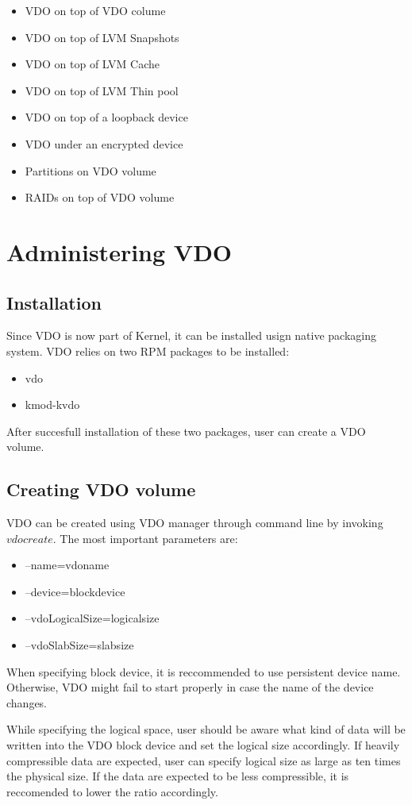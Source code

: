\documentclass[
  color, %
  table, %
  lof,   %
  lot,   %
]{fithesis3}
\begin{document}
\begin{itemize}
  \item VDO on top of VDO colume
  \item VDO on top of LVM Snapshots
  \item VDO on top of LVM Cache
  \item VDO on top of LVM Thin pool
  \item VDO on top of a loopback device
  \item VDO under an encrypted device
  \item Partitions on VDO volume
  \item RAIDs on top of VDO volume          
\end{itemize}

\section{Administering VDO}
\subsection{Installation}
Since VDO is now part of Kernel, it can be installed usign native packaging system. VDO relies on two RPM packages to be installed:
\begin{itemize}
    \item vdo
    \item kmod-kvdo
\end{itemize}
After succesfull installation of these two packages, user can create a VDO volume.

\subsection{Creating VDO volume}
VDO can be created using VDO manager through command line by invoking $vdo create$.
The most important parameters are:
\begin{itemize}
    \item --name=vdoname
    \item --device=blockdevice
    \item --vdoLogicalSize=logicalsize
    \item --vdoSlabSize=slabsize
\end{itemize}

When specifying block device, it is reccommended to use persistent device name. Otherwise, VDO might fail to start properly in case the name of the device changes.

While specifying the logical space, user should be aware what kind of data will be written into the VDO block device and set the logical size accordingly. If heavily compressible data are expected, user can specify logical size as large as ten times the physical size. If the data are expected to be less compressible, it is reccomended to lower the ratio accordingly.
\end{document}
